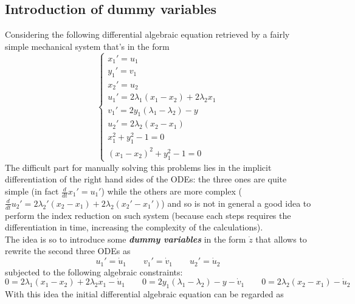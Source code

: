 \subsection{Introduction of dummy variables}
	Considering the following differential algebraic equation retrieved by a fairly simple mechanical system that's in the form
	\begin{equation} \label{eq:dae:dummyinitial}
	\begin{cases}
		x_1' = u_1 \\ y_1' = v_1 \\ x_2' = u_2 \\
		u_1' = 2 \lambda_1 (x_1-x_2) + 2\lambda_2 x_1 \\
		v_1' = 2 y_1(\lambda_1 - \lambda_2) - y \\
		u_2' = 2 \lambda_2 (x_2 - x_1) \\
		x_1^2 + y_1^2 - 1 = 0 \\
		(x_1-x_2)^2 + y_1^2 - 1 = 0
	\end{cases}
	\end{equation}
	The difficult part for manually solving this problems lies in the implicit differentiation of the right hand sides of the ODEs: the three ones are quite simple (in fact $\frac d{dt}x_1' = u_1'$) while the others are more complex ($\frac d{dt}u_2' = 2\lambda_2'(x_2-x_1) + 2\lambda_2(x_2'-x_1')$) and so is not in general a good idea to perform the index reduction on such system (because each steps requires the differentiation in time, increasing the complexity of the calculations).\\
	The idea is so to introduce some \textbf{\textit{dummy variables}} in the form $\dot z$ that allows to rewrite the second three ODEs as
	\[ u_1' = \dot u_1 \qquad v_1' = \dot v_1 \qquad u_2' = \dot u_2 \] 
	subjected to the following algebraic constraints:
	\[ 0 = 2\lambda_1(x_1-x_2) + 2 \lambda_2 x_1 - \dot u_1 \qquad 0 = 2y_1(\lambda_1-\lambda_2) - y - \dot v_1 \qquad 0 =  2\lambda_2 (x_2-x_1) - \dot u_2  \]
	With this idea the initial differential algebraic equation can be regarded as

